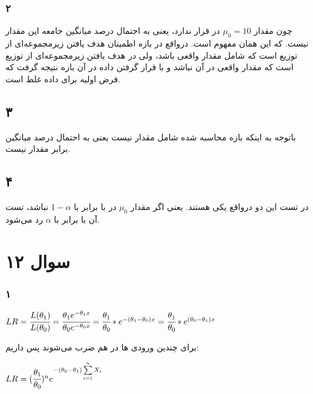 \documentclass[12pt]{article}
\begin{document}
\subsubsection{۲}
چون مقدار 
$\mu_0 = 10$
در 
قرار ندارد، یعنی به احتمال 
درصد میانگین جامعه این مقدار نیست. که این همان مفهوم 
است. درواقع در بازه اطمینان هدف یافتن زیرمجموعه‌ای از توزیع است که شامل مقدار واقعی باشد، ولی در 
هدف یافتن زیرمجموعه‌ای از توزیع است که مقدار واقعی در آن نباشد و با قرار گرفتن داده در آن بازه نتیجه گرفت که فرض اولیه برای داده غلط است.
\subsection{۳}
باتوجه به اینکه بازه محاسبه شده شامل مقدار 
نیست یعنی به احتمال 
درصد میانگین برابر مقدار 
نیست.
\subsection{۴}
در تست 
این دو درواقع یکی هستند. یعنی اگر مقدار $\mu_0$ در 
با 
برابر با 
$1 - \alpha$
نباشد،‌ تست آن با 
برابر با 
$\alpha$
رد می‌شود.

	\section{سوال ۱۲}
	\subsubsection{۱}
	\begin{latin}
		$
		LR 
		= \cfrac{L(\theta_1)}{L(\theta_0)}
		= \cfrac{\theta_1 e^{-\theta_1 x}}{\theta_0 e^ {-\theta_0 x}}
		= \cfrac{\theta_1}{\theta_0} * e^{-(\theta_1 - \theta_0) x }
		= \cfrac{\theta_1}{\theta_0} * e^{(\theta_0 - \theta_1) x}
		$
	\end{latin}
	برای چندین ورودی 
	ها در هم ضرب می‌شوند پس داریم:
	\begin{latin}
		$
		LR = (\cfrac{\theta_1}{\theta_0})^n  e^{-(\theta_0 - \theta_1) \sum\limits_{i = 1}^n X_i }
		$
	\end{latin}
\end{document}
